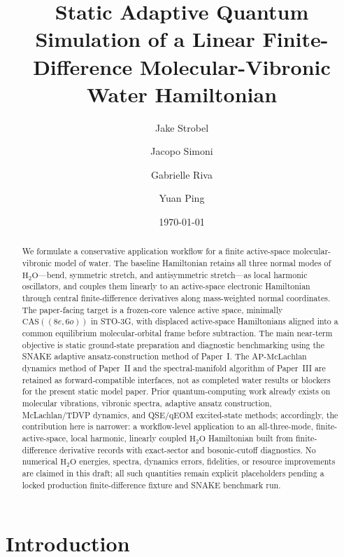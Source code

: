 \documentclass[
  reprint,
  amsmath,
  amssymb,
  aps,
  pra,
  nofootinbib,
  superscriptaddress,
  floatfix
]{revtex4-2}
\newcommand{\CAS}{\mathrm{CAS}}
\newcommand{\HtwoO}{\mathrm{H_2O}}
\newcommand{\APM}{\mathrm{AP}\text{-}\mathrm{McLachlan}}
\begin{document}
\title{Static Adaptive Quantum Simulation of a Linear Finite-Difference Molecular-Vibronic Water Hamiltonian}

\author{Jake Strobel}
\author{Jacopo Simoni}
\author{Gabrielle Riva}
\author{Yuan Ping}

\date{\today}

\begin{abstract}
We formulate a conservative application workflow for a finite active-space molecular-vibronic model of water.  The baseline Hamiltonian retains all three normal modes of \(\HtwoO\)---bend, symmetric stretch, and antisymmetric stretch---as local harmonic oscillators, and couples them linearly to an active-space electronic Hamiltonian through central finite-difference derivatives along mass-weighted normal coordinates.  The paper-facing target is a frozen-core valence active space, minimally \(\CAS((8e,6o))\) in STO-3G, with displaced active-space Hamiltonians aligned into a common equilibrium molecular-orbital frame before subtraction.  The main near-term objective is static ground-state preparation and diagnostic benchmarking using the SNAKE adaptive ansatz-construction method of Paper~I.  The \(\APM\) dynamics method of Paper~II and the spectral-manifold algorithm of Paper~III are retained as forward-compatible interfaces, not as completed water results or blockers for the present static model paper.  Prior quantum-computing work already exists on molecular vibrations, vibronic spectra, adaptive ansatz construction, McLachlan/TDVP dynamics, and QSE/qEOM excited-state methods; accordingly, the contribution here is narrower: a workflow-level application to an all-three-mode, finite-active-space, local harmonic, linearly coupled \(\HtwoO\) Hamiltonian built from finite-difference derivative records with exact-sector and bosonic-cutoff diagnostics.  No numerical \(\HtwoO\) energies, spectra, dynamics errors, fidelities, or resource improvements are claimed in this draft; all such quantities remain explicit placeholders pending a locked production finite-difference fixture and SNAKE benchmark run.
\end{abstract}

\maketitle

\section{Introduction}
\label{sec:introduction}
\end{document}
